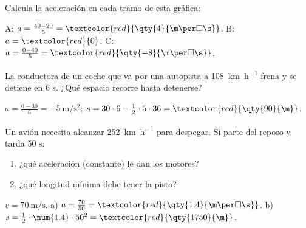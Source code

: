 \begin{exercise}
    Calcula la aceleración en cada tramo de esta gráfica:
    \begin{center}
    \end{center}
    \begin{solu}
        A: \(a = \frac{40 - 20}{5} = \textcolor{red}{\qty{4}{\m\per\square\s}}\). B: \(a = \textcolor{red}{0}\). C: \(a = \frac{0 - 40}{5} = \textcolor{red}{\qty{-8}{\m\per\square\s}}\).
    \end{solu}
\end{exercise}

\begin{exercise}
    La conductora de un coche que va por una autopista a \qty{108}{\km\per\hour} frena y se detiene en 6 s. ¿Qué espacio recorre hasta detenerse?
    \begin{solu}
        \(a = \frac{0 - 30}{6} = \qty{-5}{\m\per\square\s}\); \(s = 30 \cdot 6 - \frac{1}{2} \cdot 5 \cdot 36 = \textcolor{red}{\qty{90}{\m}}\).
    \end{solu}
\end{exercise}

\begin{exercise}
    Un avión necesita alcanzar \qty{252}{\km\per\hour} para despegar. Si parte del reposo y tarda 50 s:
    \begin{enumerate}[label=\alph*)]
        \item ¿qué aceleración (constante) le dan los motores?
        \item ¿qué longitud mínima debe tener la pista?
    \end{enumerate}
    \begin{solu}
        \(v = \qty{70}{\m\per\s}\). a) \(a = \frac{70}{50} = \textcolor{red}{\qty{1.4}{\m\per\square\s}}\). b) \(s = \frac{1}{2} \cdot \num{1.4} \cdot 50^2 = \textcolor{red}{\qty{1750}{\m}}\).
    \end{solu}
\end{exercise}

